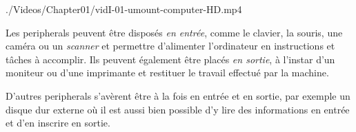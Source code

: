 \begin{marginvideo}
		{./Videos/Chapter01/vidI-01-umount-computer-HD.mp4}%
\end{marginvideo}

Les \glspl{peripheral} peuvent être disposés \emph{en entrée}, comme le clavier, la souris, une caméra ou un \textit{scanner} et permettre d'alimenter l'ordinateur en instructions et tâches à accomplir. Ils peuvent également être placés \emph{en sortie}, à l'instar d'un moniteur ou d'une imprimante et restituer le travail effectué par la machine. 

D'autres \glspl{peripheral} s'avèrent être à la fois en entrée et en sortie, par exemple un disque dur externe où il est aussi bien possible d'y lire des informations en entrée et d'en inscrire en sortie.

